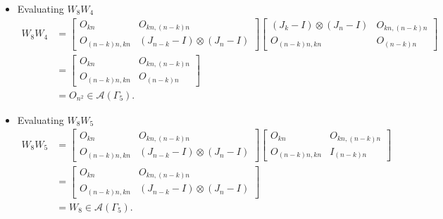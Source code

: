 \begin{itemize}
\item Evaluating $W_{8}W_{4}$
\begin{align*}
    W_8W_4
    &= \begin{bmatrix}
        O_{kn} & O_{kn, (n-k)n} \\
        O_{(n-k)n,kn} & (J_{n-k} - I) \otimes (J_n-I)
    \end{bmatrix}
    \begin{bmatrix}
        (J_k-I)\otimes (J_n-I) & O_{kn, (n-k)n} \\
        O_{(n-k)n,kn} & O_{(n-k)n}
    \end{bmatrix}\\
    &= \begin{bmatrix}
        O_{kn} & O_{kn, (n-k)n} \\
        O_{(n-k)n,kn} & O_{(n-k)n}
    \end{bmatrix}\\
    &= O_{n^2} \in\mathcal{A}(\Gamma_5).
\end{align*}

\item Evaluating $W_{8}W_{5}$
\begin{align*}
    W_8W_5
    &= \begin{bmatrix}
        O_{kn} & O_{kn, (n-k)n} \\
        O_{(n-k)n,kn} & (J_{n-k} - I) \otimes (J_n-I)
    \end{bmatrix}
    \begin{bmatrix}
        O_{kn} & O_{kn, (n-k)n} \\
        O_{(n-k)n,kn} & I_{(n - k)n}
    \end{bmatrix}\\
    &= \begin{bmatrix}
        O_{kn} & O_{kn, (n-k)n} \\
        O_{(n-k)n,kn} & (J_{n-k} - I) \otimes (J_n-I)
    \end{bmatrix}\\
    &= W_8\in\mathcal{A}(\Gamma_5).
\end{align*}


\end{itemize}
